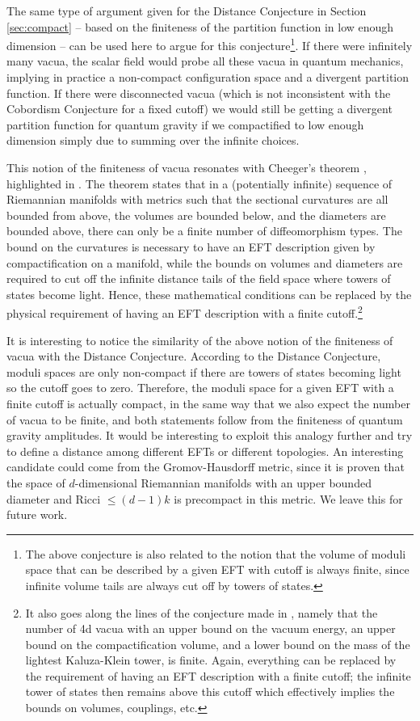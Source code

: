 \documentclass[11pt]{article}
\numberwithin{equation}{section}
\numberwithin{equation}{section}
\theoremstyle{remark}
\begin{document}
The same type of argument given for the Distance Conjecture in Section \ref{sec:compact} -- based on the finiteness of the partition function in low enough dimension -- can be used here to argue for this conjecture\footnote{The above conjecture is also related to the notion that the volume of moduli space that can be described by a given EFT with cutoff is always finite, since infinite volume tails are always cut off by towers of states.}. If there were infinitely many vacua, the scalar field would probe all these vacua in quantum mechanics, implying in practice a non-compact configuration space and a divergent partition function.
If there were disconnected vacua (which is not inconsistent with the Cobordism Conjecture for a fixed cutoff) we would still be getting a divergent partition function for quantum gravity if we compactified to low enough dimension simply due to summing over the infinite choices.



This notion of the finiteness of vacua resonates with Cheeger's theorem \cite{cheeger}, highlighted in \cite{Acharya:2006zw}. The theorem states that in a (potentially infinite) sequence of Riemannian manifolds with metrics
such that the sectional curvatures are all bounded from above, the volumes are bounded below, and the diameters are bounded above,
there can only be a finite number of diffeomorphism types. The bound on the curvatures is necessary to have an EFT description given by compactification on a manifold, while the bounds on volumes and diameters are required to cut off the infinite distance tails of the field space where towers of states become light. Hence, these mathematical conditions can be replaced by the physical requirement of having an EFT description with a finite cutoff.\footnote{
It also goes along the lines of the conjecture made in \cite{Acharya:2006zw}, namely that the number of 4d vacua with an upper bound on the vacuum
energy, an upper bound on the compactification volume, and a lower bound on the mass of the lightest Kaluza-Klein tower, is finite. Again, everything can be replaced by the requirement of having an EFT description with a finite cutoff; the infinite tower of states then remains above this cutoff which effectively implies the bounds on volumes, couplings, etc.}

It is interesting to notice the similarity of the above notion of the finiteness of vacua with the Distance Conjecture. According to the Distance Conjecture, moduli spaces are only non-compact if there are towers of states becoming light so the cutoff goes to zero. Therefore, the moduli space for a given EFT with a finite cutoff is actually compact, in the same way that we also expect the number of vacua to be finite, and both statements follow from the finiteness of quantum gravity amplitudes.  It would be interesting to exploit this analogy further and try to define a distance among different EFTs or different topologies. An interesting candidate could come from the Gromov-Hausdorff metric, since it is proven that the space of $d$-dimensional Riemannian manifolds with an upper bounded diameter  and  Ricci $\leq(d-1)k$ is precompact in this metric. We leave this for future work. 
\end{document}
